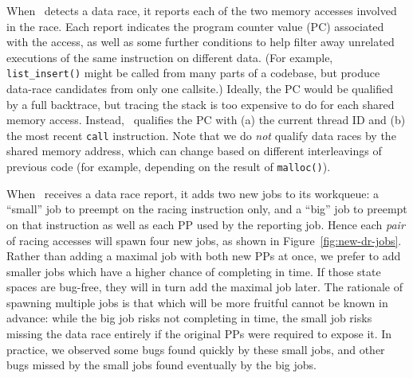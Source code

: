 When \landslide~detects a data race, it reports each of the two memory accesses involved in the race.
Each report indicates the program counter value (PC) associated with the access, as well as some further conditions to help filter away unrelated executions of the same instruction on different data.
(For example, {\tt list\_insert()} might be called from many parts of a codebase, but produce data-race candidates from only one callsite.)
Ideally, the PC would be qualified by a full backtrace, but tracing the stack is too expensive to do for each shared memory access.
Instead, \landslide~qualifies the PC with
(a) the current thread ID and
(b) the most recent {\tt call} instruction.
Note that we do {\em not} qualify data races by the shared memory address,
which can change based on different interleavings of previous code
(for example, depending on the result of {\tt malloc()}).


When \quicksand~receives a data race report, it adds two new jobs to its workqueue:
a ``small'' job to preempt on the racing instruction only,
and a ``big'' job to preempt on that instruction as well as each PP used by the reporting job.
%
Hence each {\em pair} of racing accesses will spawn four new jobs, as shown in Figure~\ref{fig:new-dr-jobs}.
Rather than adding a maximal job with both new PPs at once, we prefer to add smaller jobs which have a higher chance of completing in time.
If those state spaces are bug-free, they will in turn add the maximal job later.
%
The rationale of spawning multiple jobs is that which will be more fruitful cannot be known in advance:
while the big job risks not completing in time,
the small job risks missing the data race entirely if the original PPs were required to expose it.
In practice, we observed some bugs found quickly by these small jobs, and other bugs missed by the small jobs found eventually by the big jobs.




